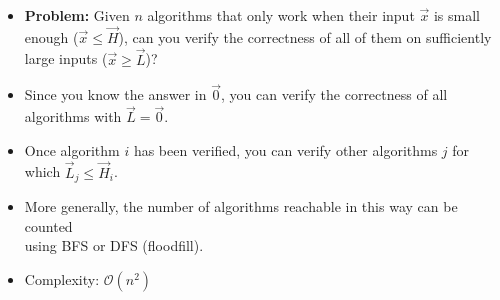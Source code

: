 \begin{frame}
    \frametitle{\problemtitle}
    \begin{itemize}
        \item<+-> \textbf{Problem:} Given $n$ algorithms that only work when
            their input $\vec x$ is small enough ($\vec x \leq \vec H$), can you verify the correctness of all
            of them on sufficiently large inputs ($\vec x \geq \vec L$)?
        \item<+-> Since you know the answer in $\vec 0$, you can verify the correctness of all algorithms with
            $\vec L = \vec 0$.
        \item<+-> Once algorithm $i$ has been verified, you can verify other algorithms $j$ for which $\vec L_j \leq \vec H_i$.
        \item<+-> More generally, the number of algorithms reachable in this way
            can be counted \\ using BFS or DFS (floodfill).
        \item<+-> Complexity: $\mathcal O(n^2)$
    \end{itemize}
    \solvestats
\end{frame}
